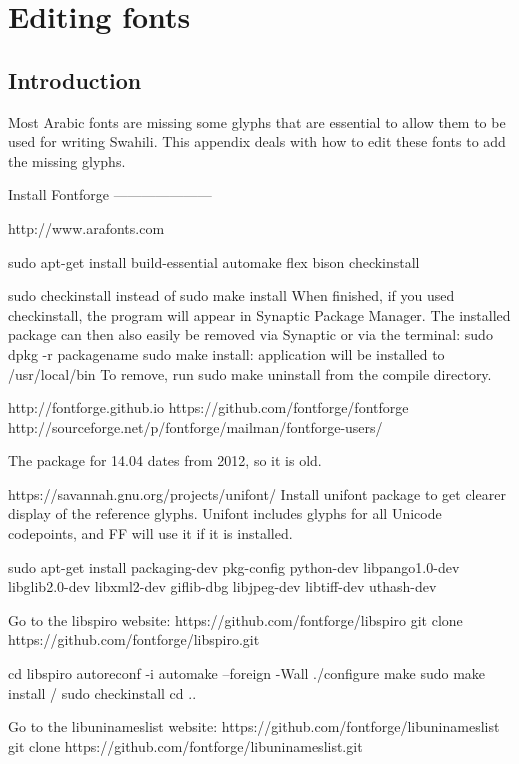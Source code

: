 \chapter{Editing fonts}
\renewcommand{\thesection}{B/\arabic{section}}  %
\setcounter{section}{0}  %

\section{Introduction}
\label{appb:intro}

Most Arabic fonts are missing some glyphs that are essential to allow them to be used for writing Swahili.  This appendix deals with how to edit these fonts to add the missing glyphs.


Install Fontforge
---------------------

http://www.arafonts.com

sudo apt-get install build-essential automake flex bison checkinstall

sudo checkinstall instead of sudo make install
 When finished, if you used checkinstall, the program will appear in Synaptic Package Manager. 
The installed package can then also easily be removed via Synaptic or via the terminal:
sudo dpkg -r packagename
sudo make install: application will be installed to /usr/local/bin
To remove, run sudo make uninstall from the compile directory.

http://fontforge.github.io
https://github.com/fontforge/fontforge
http://sourceforge.net/p/fontforge/mailman/fontforge-users/

The package for 14.04 dates from 2012, so it is old.

https://savannah.gnu.org/projects/unifont/
Install unifont package to get clearer display of the reference glyphs.  Unifont includes glyphs for all Unicode codepoints, and FF will use it if it is installed.

sudo apt-get install packaging-dev pkg-config python-dev libpango1.0-dev libglib2.0-dev libxml2-dev giflib-dbg libjpeg-dev libtiff-dev uthash-dev

Go to the libspiro website:
https://github.com/fontforge/libspiro
git clone https://github.com/fontforge/libspiro.git

cd libspiro
autoreconf -i
automake --foreign -Wall
./configure
make
sudo make install / sudo checkinstall
cd ..

Go to the libuninameslist website:
https://github.com/fontforge/libuninameslist
git clone https://github.com/fontforge/libuninameslist.git

